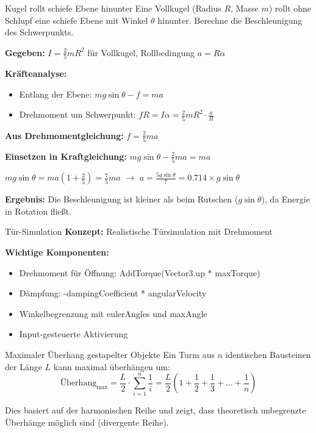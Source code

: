 \begin{example2}{Kugel rollt schiefe Ebene hinunter}
    Eine Vollkugel (Radius $R$, Masse $m$) rollt ohne Schlupf eine schiefe Ebene mit Winkel $\theta$ hinunter. Berechne die Beschleunigung des Schwerpunkts.
    
    \textbf{Gegeben:} $I = \frac{2}{5}mR^2$ für Vollkugel, Rollbedingung $a = R\alpha$
    
    \textbf{Kräfteanalyse:}
    \begin{itemize}
        \item Entlang der Ebene: $mg\sin\theta - f = ma$
        \item Drehmoment um Schwerpunkt: $fR = I\alpha = \frac{2}{5}mR^2 \cdot \frac{a}{R}$
    \end{itemize}
    
    \textbf{Aus Drehmomentgleichung:} $f = \frac{2}{5}ma$
    
    \textbf{Einsetzen in Kraftgleichung:}
    $mg\sin\theta - \frac{2}{5}ma = ma$
    
    $mg\sin\theta = ma(1 + \frac{2}{5}) = \frac{7}{5}ma$
    $\rightarrow$
    $a = \frac{5g\sin\theta}{7} = 0.714 \times g\sin\theta$
    
    \textbf{Ergebnis:} Die Beschleunigung ist kleiner als beim Rutschen ($g\sin\theta$), da Energie in Rotation fließt.
\end{example2}

\begin{example2}{Tür-Simulation}
    \textbf{Konzept:} Realistische Türsimulation mit Drehmoment
 
    \textbf{Wichtige Komponenten:}
    \begin{itemize}
        \item Drehmoment für Öffnung: AddTorque(Vector3.up * maxTorque)
        \item Dämpfung: -dampingCoefficient * angularVelocity
        \item Winkelbegrenzung mit eulerAngles und maxAngle
        \item Input-gesteuerte Aktivierung
    \end{itemize}
\end{example2}

\begin{example2}{Maximaler Überhang gestapelter Objekte}
    Ein Turm aus $n$ identischen Bausteinen der Länge $L$ kann maximal überhängen um:
    $$
        \text{Überhang}_{\text{max}} = \frac{L}{2} \cdot \sum_{i=1}^{n} \frac{1}{i} = \frac{L}{2}(1 + \frac{1}{2} + \frac{1}{3} + ... + \frac{1}{n})
    $$
    
    Dies basiert auf der harmonischen Reihe und zeigt, dass theoretisch unbegrenzte Überhänge möglich sind (divergente Reihe).
\end{example2}